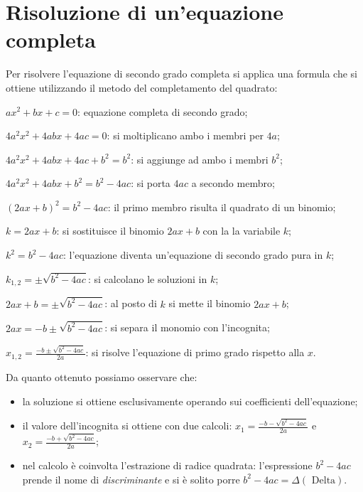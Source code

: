 \section{Risoluzione di un'equazione completa}
Per risolvere l’equazione di secondo grado completa si applica una formula che si ottiene utilizzando il metodo del completamento del quadrato:
\begin{description*}
\item $a x^{2} + b x + c=0$: equazione completa di secondo grado;
\item $4 a^{2} x^{2} + 4 a b x + 4 a c=0$: si moltiplicano ambo i membri per $4a$;
\item $4 a^{2} x^{2} + 4 a b x + 4 a c + b^{2}=b^{2}$: si aggiunge ad ambo i membri $b^{2}$;
\item $4 a^{2} x^{2} + 4 a b x + b^{2}=b^{2} - 4 a c$: si porta $4ac$ a secondo membro;
\item $( 2 a x + b )^{2}=b^{2} - 4 a c$: il primo membro risulta il quadrato di un binomio;
\item $k=2 a x + b$: si sostituisce il binomio $2ax + b$ con la la variabile $k$;
\item $k^{2}=b^{2} - 4 a c$: l'equazione diventa un'equazione di secondo grado pura in $k$;
\item $k_{1,2}=\pm \sqrt{b^{2} - 4 a c}$: si calcolano le soluzioni in $k$;
\item $2 a x + b=\pm \sqrt{b^{2} - 4 a c}$: al posto di $k$ si mette il binomio $2ax + b$;
\item $2 a x=- b \pm \sqrt{b^{2} - 4 a c}$: si separa il monomio con l’incognita;
\item $x_{1,2}=\frac{- b \pm \sqrt{b^{2} - 4 a c}}{2 a}$: si risolve l'equazione di primo grado rispetto alla $x$.
\end{description*}

Da quanto ottenuto possiamo osservare che:
\begin{itemize}
\item la soluzione si ottiene esclusivamente operando sui coefficienti
dell'equazione;
\item il valore dell'incognita si ottiene con due calcoli: $x_{1} = \frac{- b - \sqrt{b^{2} - 4 ac}}{2 a}$ e $ x_{2} = \frac{- b + \sqrt{b^{2} - 4 ac}}{2 a}$;
\item nel calcolo è coinvolta l'estrazione di radice quadrata: l'espressione $b^{2} - 4 ac$ prende il nome di \emph{discriminante} e si è solito porre
$b^{2} - 4 ac = \Delta (\text{ Delta})$.
\end{itemize}

